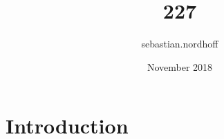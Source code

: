 \documentclass{article}
\title{227}
\author{sebastian.nordhoff }
\date{November 2018}
\begin{document}
\maketitle

\section{Introduction}
\end{document}
